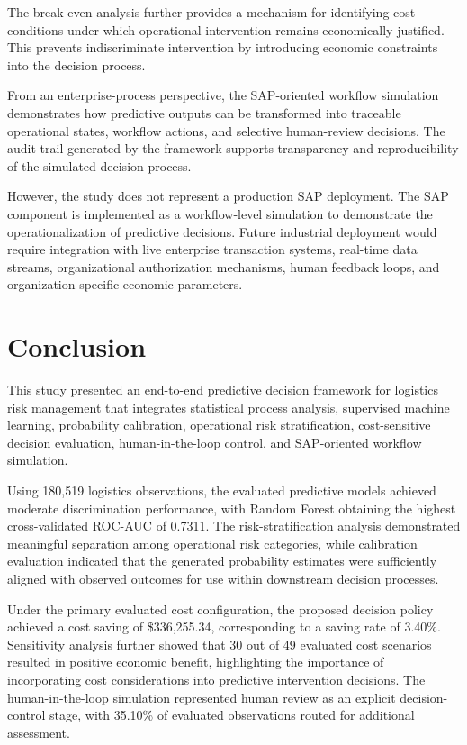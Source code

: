 \documentclass[11pt,a4paper]{article}
\begin{document}
The break-even analysis further provides a mechanism for identifying cost conditions under which operational intervention remains economically justified. This prevents indiscriminate intervention by introducing economic constraints into the decision process.

From an enterprise-process perspective, the SAP-oriented workflow simulation demonstrates how predictive outputs can be transformed into traceable operational states, workflow actions, and selective human-review decisions. The audit trail generated by the framework supports transparency and reproducibility of the simulated decision process.

However, the study does not represent a production SAP deployment. The SAP component is implemented as a workflow-level simulation to demonstrate the operationalization of predictive decisions. Future industrial deployment would require integration with live enterprise transaction systems, real-time data streams, organizational authorization mechanisms, human feedback loops, and organization-specific economic parameters.
\section{Conclusion}

This study presented an end-to-end predictive decision framework for logistics risk management that integrates statistical process analysis, supervised machine learning, probability calibration, operational risk stratification, cost-sensitive decision evaluation, human-in-the-loop control, and SAP-oriented workflow simulation.

Using 180,519 logistics observations, the evaluated predictive models achieved moderate discrimination performance, with Random Forest obtaining the highest cross-validated ROC-AUC of 0.7311. The risk-stratification analysis demonstrated meaningful separation among operational risk categories, while calibration evaluation indicated that the generated probability estimates were sufficiently aligned with observed outcomes for use within downstream decision processes.

Under the primary evaluated cost configuration, the proposed decision policy achieved a cost saving of \$336,255.34, corresponding to a saving rate of 3.40\%. Sensitivity analysis further showed that 30 out of 49 evaluated cost scenarios resulted in positive economic benefit, highlighting the importance of incorporating cost considerations into predictive intervention decisions. The human-in-the-loop simulation represented human review as an explicit decision-control stage, with 35.10\% of evaluated observations routed for additional assessment.
\end{document}
